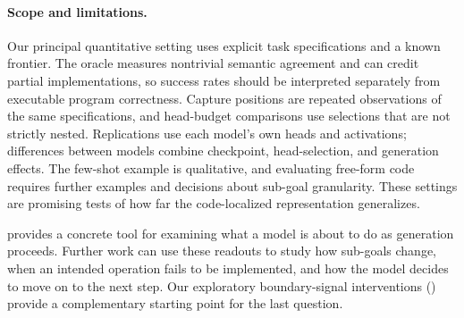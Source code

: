 \paragraph{Scope and limitations.}
Our principal quantitative setting uses explicit task specifications and a known frontier. The oracle measures nontrivial semantic agreement and can credit partial implementations, so success rates should be interpreted separately from executable program correctness. Capture positions are repeated observations of the same specifications, and head-budget comparisons use selections that are not strictly nested. Replications use each model's own heads and activations; differences between models combine checkpoint, head-selection, and generation effects. The few-shot example is qualitative, and evaluating free-form code requires further examples and decisions about sub-goal granularity. These settings are promising tests of how far the code-localized representation generalizes.

\goalscope provides a concrete tool for examining what a model is about to do as generation proceeds. Further work can use these readouts to study how sub-goals change, when an intended operation fails to be implemented, and how the model decides to move on to the next step. Our exploratory boundary-signal interventions () provide a complementary starting point for the last question.
